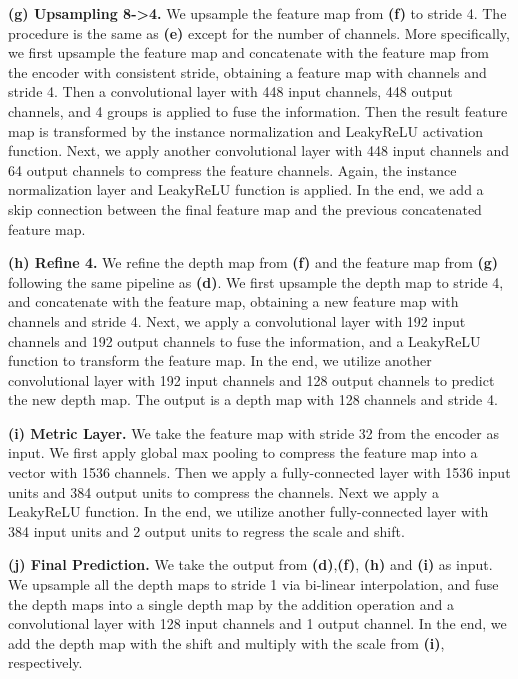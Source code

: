 \documentclass{article} \usepackage{iclr2023_conference, times}
\newcommand{\formattedparagraph}[1]{\noindent \textbf{#1}}
\begin{document}
\formattedparagraph{(g) Upsampling 8->4.} We upsample the feature map from \textbf{(f)} to stride 4. The procedure is the same as \textbf{(e)} except for the number of channels. More specifically, we first upsample the feature map and concatenate with the feature map from the encoder with consistent stride, obtaining a feature map with  channels and stride 4. Then a convolutional layer with 448 input channels, 448 output channels, and 4 groups is applied to fuse the information. Then the result feature map is transformed by the instance normalization and LeakyReLU activation function. Next, we apply another convolutional layer with 448 input channels and 64 output channels to compress the feature channels. Again, the instance normalization layer and LeakyReLU function is applied. In the end, we add a skip connection between the final feature map and the previous concatenated feature map.

\formattedparagraph{(h) Refine 4.} We refine the depth map from \textbf{(f)} and the feature map from \textbf{(g)} following the same pipeline as \textbf{(d)}. We first upsample the depth map to stride 4, and concatenate with the feature map, obtaining a new feature map with  channels and stride 4. Next, we apply a convolutional layer with 192 input channels and 192 output channels to fuse the information, and a LeakyReLU function to transform the feature map. In the end, we utilize another convolutional layer with 192 input channels and 128 output channels to predict the new depth map. The output is a depth map with 128 channels and stride 4.

\formattedparagraph{(i) Metric Layer.} We take the feature map with stride 32 from the encoder as input. We first apply global max pooling to compress the feature map into a vector with 1536 channels. Then we apply a fully-connected layer with 1536 input units and 384 output units to compress the channels. Next we apply a LeakyReLU function. In the end, we utilize another fully-connected layer with 384 input units and 2 output units to regress the scale and shift.


\formattedparagraph{(j) Final Prediction.} We take the output from \textbf{(d)},\textbf{(f)},  \textbf{(h)} and \textbf{(i)} as input. We upsample all the depth maps to stride 1 via bi-linear interpolation, and fuse the depth maps into a single depth map by the addition operation and a convolutional layer with 128 input channels and 1 output channel. In the end, we add the depth map with the shift and multiply with the scale from \textbf{(i)}, respectively.
\end{document}
